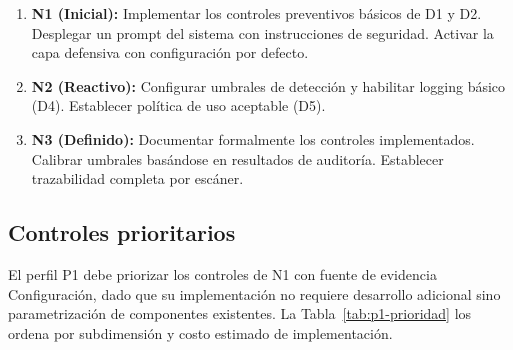 \begin{enumerate}[leftmargin=2em]
  \item \textbf{N1 (Inicial):} Implementar los controles preventivos básicos de D1 y D2. Desplegar un prompt del sistema con instrucciones de seguridad. Activar la capa defensiva con configuración por defecto.
  \item \textbf{N2 (Reactivo):} Configurar umbrales de detección y habilitar logging básico (D4). Establecer política de uso aceptable (D5).
  \item \textbf{N3 (Definido):} Documentar formalmente los controles implementados. Calibrar umbrales basándose en resultados de auditoría. Establecer trazabilidad completa por escáner.
\end{enumerate}

\subsection{Controles prioritarios}

El perfil P1 debe priorizar los controles de N1 con fuente de evidencia Configuración, dado que su implementación no requiere desarrollo adicional sino parametrización de componentes existentes. La Tabla~\ref{tab:p1-prioridad} los ordena por subdimensión y costo estimado de implementación.

